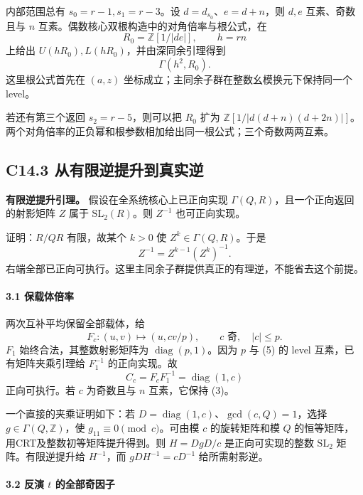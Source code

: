 {内部范围总有} \(s_0=r-1,s_1=r-3\){。设} \(d=d_{s_0}\){、}\(e=d+n\){，则} \(d,e\) {互素、奇数且与} \(n\) {互素。偶数核心双根构造中的对角倍率与根公式，在} \[
R_0=\mathbb Z[1/|de|],\qquad h=rn
\] {上给出} \(U(hR_0),L(hR_0)\){，并由深同余引理得到} \[
\Gamma(h^2,R_0).\tag{C14.5}
\] {这里根公式首先在} \((a,z)\) {坐标成立；主同余子群在整数幺模换元下保持同一个} {level。}

{若还有第三个返回} \(s_2=r-5\){，则可以把} \(R_0\) {扩为} \(\mathbb Z[1/|d(d+n)(d+2n)|]\){。两个对角倍率的正负幂和根参数相加给出同一根公式；三个奇数两两互素。}

\subsection*{\texorpdfstring{{C14.3} {从有限逆提升到真实逆}}{C14.3 从有限逆提升到真实逆}}\label{C14-h93}

\textbf{{有限逆提升引理。}} {假设在全系统核心上已正向实现} \(\Gamma(Q,R)\){，且一个正向返回的射影矩阵} \(Z\) {属于} \(\mathrm{SL}_2(R)\){。则} \(Z^{-1}\) {也可正向实现。}

{证明：}\(R/QR\) {有限，故某个} \(k>0\) {使} \(Z^k\in\Gamma(Q,R)\){。于是} \[
Z^{-1}=Z^{k-1}(Z^k)^{-1}.
\] {右端全部已正向可执行。这里主同余子群提供真正的有理逆，不能省去这个前提。}

\paragraph*{\texorpdfstring{{3.1} {保载体倍率}}{3.1 保载体倍率}}\label{C14-h94}

{两次互补平均保留全部载体，给} \[
F_c:(u,v)\mapsto(u,cv/p),\qquad c\text{ 奇},\quad |c|\le p.
\] \(F_1\) {始终合法，其整数射影矩阵为} \(\operatorname{diag}(p,1)\){。因为} \(p\) {与} {(5)} {的} {level} {互素，已有矩阵夹乘引理给} \(F_1^{-1}\) {的正向实现。故} \[
C_c=F_cF_1^{-1}=\operatorname{diag}(1,c)\tag{C14.6}
\] {正向可执行。若} \(c\) {为奇数且与} \(n\) {互素，它保持} {(3)。}

{一个直接的夹乘证明如下：若} \(D=\operatorname{diag}(1,c)\){、}\(\gcd(c,Q)=1\){，选择} \(g\in\Gamma(Q,\mathbb Z)\){，使} \(g_{11}\equiv0\pmod c\){。可由模} \(c\) {的旋转矩阵和模} \(Q\) {的恒等矩阵，用CRT及整数初等矩阵提升得到。则} \(H=DgD/c\) {是正向可实现的整数} \(\mathrm{SL}_2\) {矩阵。有限逆提升给} \(H^{-1}\){，而} \(gDH^{-1}=cD^{-1}\) {给所需射影逆。}

\paragraph*{\texorpdfstring{{3.2} {反演} \(t\) {的全部奇因子}}{3.2 反演 t 的全部奇因子}}\label{C14-h95}

